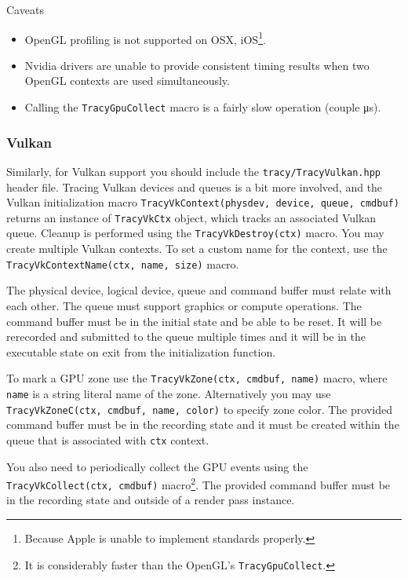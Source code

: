 \documentclass[hidelinks,titlepage,a4paper]{article}
\begin{document}
\begin{bclogo}[
noborder=true,
couleur=black!5,
logo=\bcattention
]{Caveats}
\begin{itemize}
\item OpenGL profiling is not supported on OSX, iOS\footnote{Because Apple is unable to implement standards properly.}.
\item Nvidia drivers are unable to provide consistent timing results when two OpenGL contexts are used simultaneously.
\item Calling the \texttt{TracyGpuCollect} macro is a fairly slow operation (couple \si{\micro\second}).
\end{itemize}
\end{bclogo}

\subsubsection{Vulkan}

Similarly, for Vulkan support you should include the \texttt{tracy/TracyVulkan.hpp} header file. Tracing Vulkan devices and queues is a bit more involved, and the Vulkan initialization macro \texttt{TracyVkContext(physdev, device, queue, cmdbuf)} returns an instance of \texttt{TracyVkCtx} object, which tracks an associated Vulkan queue. Cleanup is performed using the \texttt{TracyVkDestroy(ctx)} macro. You may create multiple Vulkan contexts. To set a custom name for the context, use the \texttt{TracyVkContextName(ctx, name, size)} macro.

The physical device, logical device, queue and command buffer must relate with each other. The queue must support graphics or compute operations. The command buffer must be in the initial state and be able to be reset. It will be rerecorded and submitted to the queue multiple times and it will be in the executable state on exit from the initialization function.

To mark a GPU zone use the \texttt{TracyVkZone(ctx, cmdbuf, name)} macro, where \texttt{name} is a string literal name of the zone. Alternatively you may use \texttt{TracyVkZoneC(ctx, cmdbuf, name, color)} to specify zone color. The provided command buffer must be in the recording state and it must be created within the queue that is associated with \texttt{ctx} context.

You also need to periodically collect the GPU events using the \texttt{TracyVkCollect(ctx, cmdbuf)} macro\footnote{It is considerably faster than the OpenGL's \texttt{TracyGpuCollect}.}. The provided command buffer must be in the recording state and outside of a render pass instance.
\end{document}
